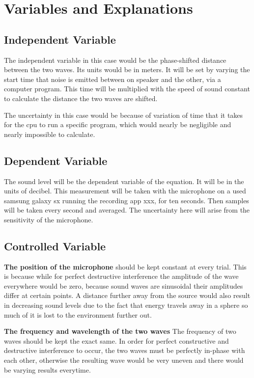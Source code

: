 \documentclass[12pt]{article}
\begin{document}
\section{Variables and Explanations}

\subsection{Independent Variable}

The independent variable in this case would be the phase-shifted distance between the two waves. Its units would be in meters. It will be set by varying the start time that noise is emitted between on speaker and the other, via a computer program. This time will be multiplied with the speed of sound constant to calculate the distance the two waves are shifted.

The uncertainty in this case would be because of variation of time that it takes for the cpu to run a specific program, which would nearly be negligible and nearly impossible to calculate.

\subsection{Dependent Variable}

The sound level will be the dependent variable of the equation. It will be in the units of decibel. This measurement will be taken with the microphone on a used samsung galaxy sx running the recording app xxx, for ten seconds. Then samples will be taken every second and averaged. The uncertainty here will arise from the sensitivity of the microphone.

\subsection{Controlled Variable}

\textbf{The position of the microphone} should be kept constant at every trial. This is because while for perfect destructive interference the amplitude of the wave everywhere would be zero, because sound waves are sinusoidal their amplitudes differ at certain points. A distance further away from the source would also result in decreasing sound levels due to the fact that energy travels away in a sphere so much of it is lost to the environment further out.

\textbf{The frequency and wavelength of the two waves} The frequency of two waves should be kept the exact same. In order for perfect constructive and destructive interference to occur, the two waves must be perfectly in-phase with each other, otherwise the resulting wave would be very uneven and there would be varying results everytime.
\end{document}
